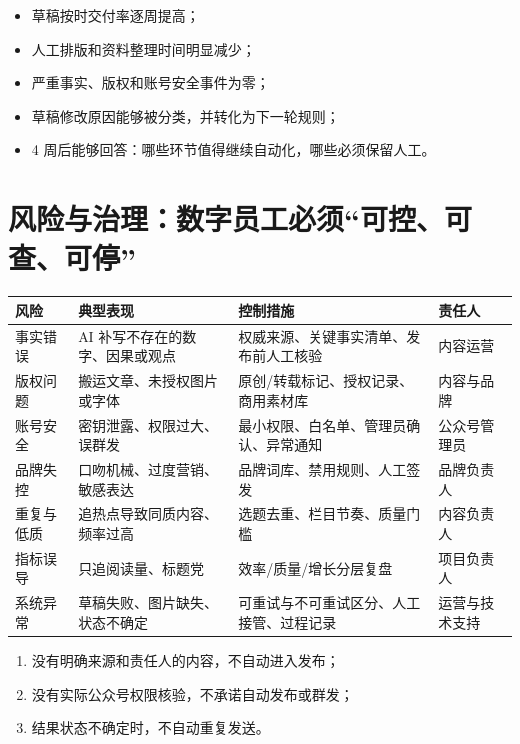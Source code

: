 \documentclass[UTF8,11pt,a4paper,fontset=none]{ctexart}
\begin{document}
\begin{itemize}
  \item 草稿按时交付率逐周提高；
  \item 人工排版和资料整理时间明显减少；
  \item 严重事实、版权和账号安全事件为零；
  \item 草稿修改原因能够被分类，并转化为下一轮规则；
  \item 4 周后能够回答：哪些环节值得继续自动化，哪些必须保留人工。
\end{itemize}

\section{风险与治理：数字员工必须“可控、可查、可停”}

\begin{tabularx}{\textwidth}{@{}L{27mm} L{40mm} Y L{37mm}@{}}
\toprule
\textbf{风险} & \textbf{典型表现} & \textbf{控制措施} & \textbf{责任人} \\
\midrule
事实错误 & AI 补写不存在的数字、因果或观点 & 权威来源、关键事实清单、发布前人工核验 & 内容运营 \\
版权问题 & 搬运文章、未授权图片或字体 & 原创/转载标记、授权记录、商用素材库 & 内容与品牌 \\
账号安全 & 密钥泄露、权限过大、误群发 & 最小权限、白名单、管理员确认、异常通知 & 公众号管理员 \\
品牌失控 & 口吻机械、过度营销、敏感表达 & 品牌词库、禁用规则、人工签发 & 品牌负责人 \\
重复与低质 & 追热点导致同质内容、频率过高 & 选题去重、栏目节奏、质量门槛 & 内容负责人 \\
指标误导 & 只追阅读量、标题党 & 效率/质量/增长分层复盘 & 项目负责人 \\
系统异常 & 草稿失败、图片缺失、状态不确定 & 可重试与不可重试区分、人工接管、过程记录 & 运营与技术支持 \\
\bottomrule
\end{tabularx}

\begin{riskbox}[三条红线]
\begin{enumerate}
  \item 没有明确来源和责任人的内容，不自动进入发布；
  \item 没有实际公众号权限核验，不承诺自动发布或群发；
  \item 结果状态不确定时，不自动重复发送。
\end{enumerate}
\end{riskbox}
\end{document}

